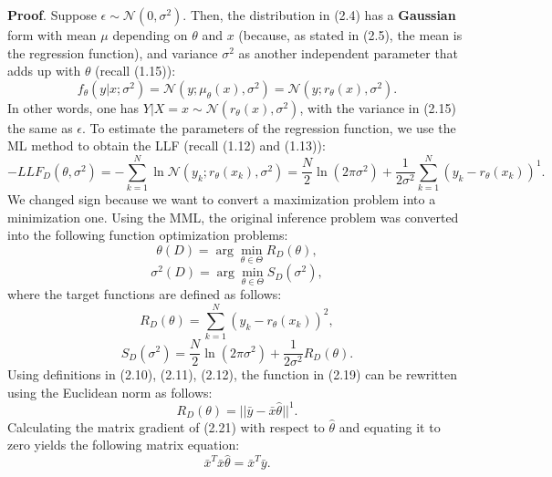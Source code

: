 \documentclass{report}
\begin{document}
\textbf{Proof}. Suppose $\epsilon \sim \mathcal{N}(0, \sigma^2)$. Then, the distribution in (2.4) has a \textbf{Gaussian} form with mean $\mu$ depending on $\theta$ and $x$ (because, as stated in (2.5), the mean is the regression function), and variance $\sigma^2$ as another independent parameter that adds up with $\theta$ (recall (1.15)):
\begin{equation}
f_\theta(y|x;\sigma^2) = \mathcal{N}(y;\mu_\theta(x),\sigma^2) = \mathcal{N}(y;r_\theta(x),\sigma^2).
\end{equation}
In other words, one has $Y|X=x \sim \mathcal{N}(r_\theta(x), \sigma^2)$, with the variance in (2.15) the same as $\epsilon$. To estimate the parameters of the regression function, we use the ML method to obtain the LLF (recall (1.12) and (1.13)):
\begin{equation}
-LLF_{D}(\theta,\sigma^2)=-\sum_{k=1}^N\ln\mathcal{N}(y_k;r_\theta(x_k),\sigma^2)=\frac{N}{2}\ln(2\pi\sigma^2)+\frac{1}{2\sigma^2}\sum_{k=1}^N(y_k-r_\theta(x_k))^1.
\end{equation}
We changed sign because we want to convert a maximization problem into a minimization one. Using the MML, the original inference problem was converted into the following function optimization problems:
\begin{equation}
 \theta(D) = \arg\min_{\theta \in \Theta} R_{D}(\theta),
\end{equation}
\begin{equation}
 \sigma^2(D) = \arg\min_{\theta \in \Theta} S_{D}(\sigma^2),
\end{equation}
where the target functions are defined as follows:
\begin{equation}
R_{D}(\theta) =\sum_{k=1}^N(y_k-r_\theta(x_k))^2,
\end{equation}
\begin{equation}
S_{D}(\sigma^2) = \frac{N}{2}\ln(2\pi\sigma^2)+\frac{1}{2\sigma^2}R_{D}(\theta).
\end{equation}
Using definitions in (2.10), (2.11), (2.12), the function in (2.19) can be rewritten using the Euclidean norm as follows:
\begin{equation}
R_{D}(\theta) = ||\bar{y} -\bar{x}\hat{\theta}||^1.
\end{equation}
Calculating the matrix gradient of (2.21) with respect to $\hat{\theta}$ and equating it to zero yields the following matrix equation:
\begin{equation}
\bar{x}^T\bar{x}\hat{\theta} = \bar{x}^T\bar{y}.
\end{equation}
\end{document}
